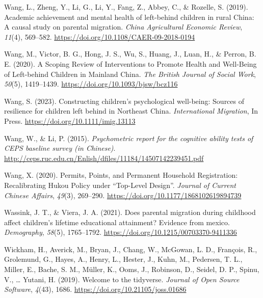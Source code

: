 \documentclass[
  man,floatsintext]{apa7}
\newlength{\cslhangindent}
\newlength{\cslentryspacingunit} %
\newenvironment{CSLReferences}[2] %
 {%
  \setlength{\parindent}{0pt}
  \ifodd #1
  \let\oldpar\par
  \def\par{\hangindent=\cslhangindent\oldpar}
  \fi
  \setlength{\parskip}{#2\cslentryspacingunit}
 }%
 {}
\begin{document}
\begin{CSLReferences}{1}{0}
\leavevmode{}%
Wang, L., Zheng, Y., Li, G., Li, Y., Fang, Z., Abbey, C., \& Rozelle, S. (2019). Academic achievement and mental health of left-behind children in rural {China}: A causal study on parental migration. \emph{{China} Agricultural Economic Review}, \emph{11}(4), 569--582. \url{https://doi.org/10.1108/CAER-09-2018-0194}

\leavevmode{}%
Wang, M., Victor, B. G., Hong, J. S., Wu, S., Huang, J., Luan, H., \& Perron, B. E. (2020). A Scoping Review of Interventions to Promote Health and Well-Being of Left-behind Children in Mainland {China}. \emph{The British Journal of Social Work}, \emph{50}(5), 1419--1439. \url{https://doi.org/10.1093/bjsw/bcz116}

\leavevmode{}%
Wang, S. (2023). Constructing children's psychological well-being: Sources of resilience for children left behind in Northeast {China}. \emph{International Migration}, In Press. \url{https://doi.org/10.1111/imig.13113}

\leavevmode{}%
Wang, W., \& Li, P. (2015). \emph{Psychometric report for the cognitive ability tests of {CEPS} baseline survey (in {Chinese})}. \url{http://ceps.ruc.edu.cn/Enlish/dfiles/11184/14507142239451.pdf}

\leavevmode{}%
Wang, X. (2020). Permits, Points, and Permanent Household Registration: Recalibrating Hukou Policy under {``}Top-Level Design{''}. \emph{Journal of Current Chinese Affairs}, \emph{49}(3), 269--290. \url{https://doi.org/10.1177/1868102619894739}

\leavevmode{}%
Wassink, J. T., \& Viera, J. A. (2021). Does parental migration during childhood affect children's lifetime educational attainment? Evidence from mexico. \emph{Demography}, \emph{58}(5), 1765--1792. \url{https://doi.org/10.1215/00703370-9411336}

\leavevmode{}%
Wickham, H., Averick, M., Bryan, J., Chang, W., McGowan, L. D., François, R., Grolemund, G., Hayes, A., Henry, L., Hester, J., Kuhn, M., Pedersen, T. L., Miller, E., Bache, S. M., Müller, K., Ooms, J., Robinson, D., Seidel, D. P., Spinu, V., \ldots{} Yutani, H. (2019). Welcome to the {tidyverse}. \emph{Journal of Open Source Software}, \emph{4}(43), 1686. \url{https://doi.org/10.21105/joss.01686}


\end{CSLReferences}
\end{document}
